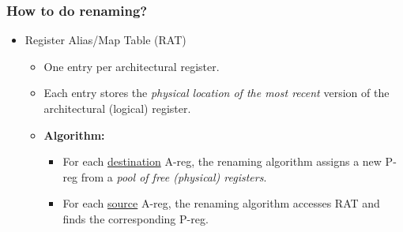 \documentclass[10pt]{article}
\begin{document}
\subsubsection*{How to do renaming?}
\begin{itemize}
    \item Register Alias/Map Table (RAT)
    \begin{itemize}
        \item One entry per architectural register.
        \item Each entry stores the \textit{physical location of the most recent} version of the architectural (logical) register.
        \item \textbf{Algorithm:}
        \begin{itemize}
            \item For each \underline{destination} A-reg, the renaming algorithm assigns a new P-reg from a \textit{pool of free (physical) registers}.
            \item For each \underline{source} A-reg, the renaming algorithm accesses RAT and finds the corresponding P-reg.
        \end{itemize}
    \end{itemize}
\end{itemize}
\end{document}
